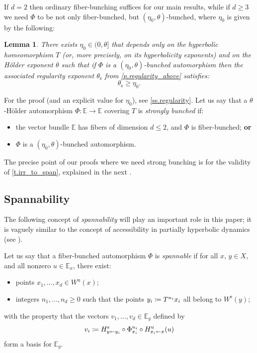 \documentclass[JEP,XML,SOM,Unicode]{cedram}
\def\vcentcolon{\mathrel{\mathop\ordinarycolon}}
\providecommand\ordinarycolon{:}
\providecommand*\coloneqq{\vcentcolon\mathrel{\mkern-1.2mu}=}
\theoremstyle{plain}
\newtheorem{lemma}[theorem]{Lemma}
\theoremstyle{definition}
\newcommand{\EE}{\mathbb{E}}
\newcommand{\uu}{\mathrm{u}}
\renewcommand{\ss}{\mathrm{s}}
\begin{document}
If $d=2$ then ordinary fiber-bunching suffices for our main results, while if $d\ge 3$ we need $\Phi$ to be not only fiber-bunched, but $(\eta_0,\theta)$-bunched, where $\eta_0$ is given by the following:

\begin{lemma}\label{l.needed_strength}
There exists $\eta_0 \in (0,\theta]$ that depends only on the hyperbolic homeomorphism $T$ (or, more precisely, on its hyperbolicity exponents) and on the Hölder exponent $\theta$
such that if $\Phi$ is a $(\eta_0,\theta)$-bunched automorphism
then the associated regularity exponent $\theta_\ss$ from \cref{p.regularity_above} satisfies:
\[
\theta_\ss \ge \eta_0.
\]
\end{lemma}

For the proof (and an explicit value for $\eta_0$), see \cref{ss.regularity}. Let us say that a $\theta$-Hölder automorphism $\Phi \colon \EE \to \EE$ covering $T$ is \emph{strongly bunched} if:
\begin{itemize}
	\item the vector bundle $\EE$ has fibers of dimension $d \le 2$, and $\Phi$ is fiber-bunched; \textbf{or}
	\item $\Phi$ is a $(\eta_0,\theta)$-bunched automorphism.
\end{itemize}

The precise point of our proofs where we need strong bunching is for the validity of \cref{t.irr_to_span}, explained in the next .

\subsection{Spannability} \label{ss.span}

The following concept of \emph{spannability} will play an important role in this paper; it is vaguely similar to the concept of accessibility in partially hyperbolic dynamics (see \eg \cite[\S8.1]{Pesin_book}).

Let us say that a fiber-bunched automorphism $\Phi$ is \emph{spannable} if for all $x$, $y \in X$, and all nonzero $u \in \EE_x$, there exist:
\begin{itemize}
	\item points $x_1, \dots, x_d \in W^\uu(x)$;
	\item integers $n_1, \dots, n_d \ge 0$ such that the points $y_i \coloneqq T^{n_i} x_i$ all belong to $W^\ss(y)$;
\end{itemize}
with the property that the vectors $v_1, \dots, v_d \in \EE_y$ defined by
\begin{equation}\label{e.spanners}
v_i \coloneqq H^\ss_{y \gets y_i} \circ \Phi^{n_i}_{x_i} \circ H^\uu_{x_i \gets x} (u)
\end{equation}
form a basis for $\EE_y$.
\end{document}
